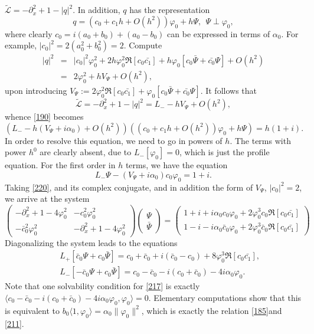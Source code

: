 \documentclass[12pt]{amsart}
\theoremstyle{definition}
\theoremstyle{remark}
\numberwithin{equation}{section}
\renewcommand{\(}{\left(}
\renewcommand{\)}{\right)}
\renewcommand{\[}{\left[}
\renewcommand{\]}{\right]}
\newcommand{\cl}{{\mathcal L}}
\newcommand{\al}{\alpha}
\newcommand{\vp}{\varphi}
\newcommand{\tcl}{\tilde{\cl}}
\newcommand{\dpr}[2]{\langle #1,#2 \rangle}
\newcommand{\p}{\partial}
\begin{document}
 $\tcl=-\p_x^2+1 - |q|^2$. In addition, $q$ has the representation
 \begin{equation}
 \label{195}
 q=(c_0+c_1 h+O(h^2))\vp_0+ h \Psi, \ \ \Psi\perp \vp_0,
 \end{equation}
 where clearly $c_0=i(a_0+b_0)+(a_0-b_0)$ can be expressed in terms of $\al_0$. For example, $|c_0|^2=2(a_0^2+b_0^2)=2$. Compute
 \begin{eqnarray*}
 |q|^2 &=& |c_0|^2 \vp_0^2 +2 h \vp_0^2 \Re[c_0\bar{c_1}]+h\vp_0[c_0\bar{\Psi}+\bar{c_0}\Psi]+O(h^2) \\
 &=& 2 \vp_0^2 + h V_\Psi+O(h^2),
 \end{eqnarray*}
 upon introducing $V_\Psi:=2  \vp_0^2 \Re[c_0\bar{c_1}]+\vp_0[c_0\bar{\Psi}+\bar{c_0}\Psi]$.
 It follows that
 $$
 \tcl=-\p_x^2+1 - |q|^2= L_- -h V_\Psi +O(h^2),
 $$
 whence   \eqref{190} becomes
 \begin{equation}
 \label{200}
 (L_--h (V_\Psi+i \al_0) +O(h^2))((c_0+c_1 h+O(h^2))\vp_0+ h \Psi)=h(1+i).
 \end{equation}
 In order to resolve this equation, we need to go in powers of $h$. The terms with power $h^0$ are clearly absent, due to $L_-[\vp_0]=0$, which is just the profile equation. For the first order in $h$ terms, we have the equation
 \begin{equation}
 \label{220}
 L_-\Psi-(V_\Psi+i \al_0)c_0 \vp_0=1+i.
 \end{equation}
 Taking \eqref{220}, and its complex conjugate,  and in addition the form of $V_\Psi$, $|c_0|^2=2$, we arrive at the system
 \begin{equation}
 \label{210}
 \left(\begin{array}{cc}
 -\p_x^2+1- 4\vp_0^2 & -c_0^2 \vp_0^2 \\
 -\bar{c}_0^2 \vp_0^2 & -\p_x^2+1- 4\vp_0^2
 \end{array}\right) \left(\begin{array}{c}
  \Psi \\ \bar{\Psi}
 \end{array}\right)= \left(\begin{array}{c}
 1+i +i \al_0 c_0 \vp_0 +2 \vp_0^3 c_0   \Re[c_0\bar{c_1}] \\  1-i -i \al_0 \bar{c}_0 \vp_0 + 2 \vp_0^3 \bar{c}_0   \Re[c_0\bar{c_1}]
 \end{array}\right)
 \end{equation}
 Diagonalizing the system leads to  the equations
 \begin{eqnarray}
 \label{215}
& &  L_+[\bar{c}_0\Psi+c_0\bar{\Psi}]= c_0+\bar{c}_0+i(\bar{c}_0-c_0)+8 \vp_0^3  \Re[c_0\bar{c_1}],  \\
 \label{217}
& &  L_-[-\bar{c}_0\Psi+c_0\bar{\Psi}] = c_0-\bar{c}_0-i(c_0+\bar{c}_0)-4 i \al_0 \vp_0.
 \end{eqnarray}
 Note that one  solvability condition for \eqref{217} is exactly $\dpr{c_0-\bar{c}_0-i(c_0+\bar{c}_0)-4 i \al_0 \vp_0}{\vp_0}=0$. Elementary computations show that this is equivalent to  $b_0 \dpr{1}{\vp_0}=\al_0 \|\vp_0\|^2$, which is exactly the relation \eqref{185}and \eqref{211}.
\end{document}
